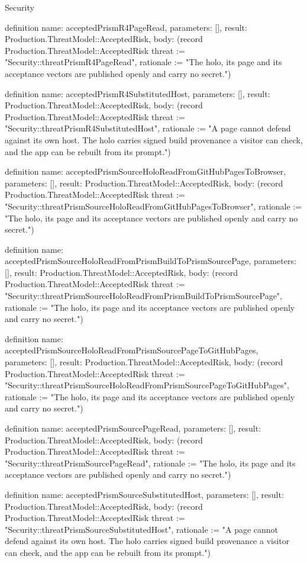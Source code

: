 \begin{lexlean}{Security}
\begin{semanticmodule}
definition{
  name: acceptedPrismR4PageRead,
  parameters: [],
  result: Production.ThreatModel::AcceptedRisk,
  body: (record Production.ThreatModel::AcceptedRisk {threat := "Security::threatPrismR4PageRead", rationale := "The holo, its page and its acceptance vectors are published openly and carry no secret."})
}

definition{
  name: acceptedPrismR4SubstitutedHost,
  parameters: [],
  result: Production.ThreatModel::AcceptedRisk,
  body: (record Production.ThreatModel::AcceptedRisk {threat := "Security::threatPrismR4SubstitutedHost", rationale := "A page cannot defend against its own host. The holo carries signed build provenance a visitor can check, and the app can be rebuilt from its prompt."})
}

definition{
  name: acceptedPrismSourceHoloReadFromGitHubPagesToBrowser,
  parameters: [],
  result: Production.ThreatModel::AcceptedRisk,
  body: (record Production.ThreatModel::AcceptedRisk {threat := "Security::threatPrismSourceHoloReadFromGitHubPagesToBrowser", rationale := "The holo, its page and its acceptance vectors are published openly and carry no secret."})
}

definition{
  name: acceptedPrismSourceHoloReadFromPrismBuildToPrismSourcePage,
  parameters: [],
  result: Production.ThreatModel::AcceptedRisk,
  body: (record Production.ThreatModel::AcceptedRisk {threat := "Security::threatPrismSourceHoloReadFromPrismBuildToPrismSourcePage", rationale := "The holo, its page and its acceptance vectors are published openly and carry no secret."})
}

definition{
  name: acceptedPrismSourceHoloReadFromPrismSourcePageToGitHubPages,
  parameters: [],
  result: Production.ThreatModel::AcceptedRisk,
  body: (record Production.ThreatModel::AcceptedRisk {threat := "Security::threatPrismSourceHoloReadFromPrismSourcePageToGitHubPages", rationale := "The holo, its page and its acceptance vectors are published openly and carry no secret."})
}

definition{
  name: acceptedPrismSourcePageRead,
  parameters: [],
  result: Production.ThreatModel::AcceptedRisk,
  body: (record Production.ThreatModel::AcceptedRisk {threat := "Security::threatPrismSourcePageRead", rationale := "The holo, its page and its acceptance vectors are published openly and carry no secret."})
}

definition{
  name: acceptedPrismSourceSubstitutedHost,
  parameters: [],
  result: Production.ThreatModel::AcceptedRisk,
  body: (record Production.ThreatModel::AcceptedRisk {threat := "Security::threatPrismSourceSubstitutedHost", rationale := "A page cannot defend against its own host. The holo carries signed build provenance a visitor can check, and the app can be rebuilt from its prompt."})
}


\end{semanticmodule}
\end{lexlean}
